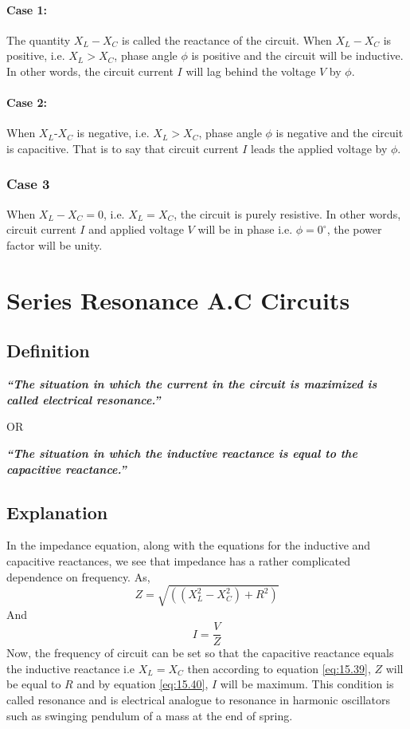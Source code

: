 \paragraph{Case 1:}
The quantity $X_{L}-X_{C}$ is called
the reactance of the circuit. When $X_{L}-X_{C}$ is positive, i.e.
$X_{L}>X_{C}$, phase angle $\phi$ is positive and the circuit will
be inductive. In other words, the circuit current $I$ will lag behind
the voltage $V$ by $\phi$.
\paragraph{Case 2:}
When $X_{L}$-$X_{C}$ is negative, i.e. $X_{L}>X_{C}$, phase angle
$\phi$ is negative and the circuit is capacitive. That is to say that
circuit current $I$ leads the applied voltage by $\phi$.
\subsubsection{Case 3}
When $X_{L}-X_{C}=0$, i.e. $X_{L}=X_{C}$, the circuit is purely resistive.
In other words, circuit current $I$ and applied voltage $V$ will be in
phase i.e. $\phi=0^{\circ}$, the power factor will be unity.
\section{Series Resonance A.C Circuits}
\subsection*{Definition}
\textit{\textbf{“The situation in which the current in the circuit is
maximized is called electrical resonance.”}}
\begin{center}
    OR
\end{center}
\textit{\textbf{“The situation in which the inductive reactance is
equal to the capacitive reactance.”}}
\subsection*{Explanation}
In the impedance equation, along with the equations for the inductive and
capacitive reactances, we see that impedance has a rather complicated
dependence on frequency. As,
\begin{equation}\label{eq:15.39}
    Z = \sqrt{ ((X_{L}^{2}-X_{C}^{2}) + R^{2})}
\end{equation}
And
\begin{equation}\label{eq:15.40}
   I = \frac{V}{Z}
\end{equation}
Now, the frequency of circuit can be set so that the capacitive reactance
equals the inductive reactance i.e $X_{L}=X_{C}$ then according to equation
\ref{eq:15.39}, $Z$ will be equal to $R$ and by equation \ref{eq:15.40},
$I$ will be maximum. This condition is called resonance and is electrical
analogue to resonance in harmonic oscillators such as swinging pendulum of
a mass at the end of spring.
